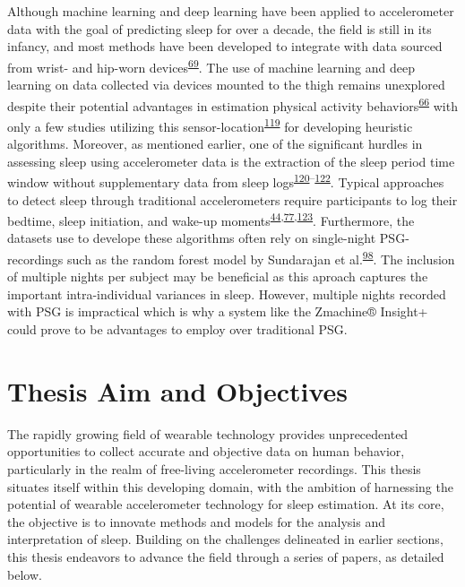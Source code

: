 \documentclass[
  10pt,
]{scrbook}
\begin{document}
Although machine learning and deep learning have been applied to
accelerometer data with the goal of predicting sleep for over a decade,
the field is still in its infancy, and most methods have been developed
to integrate with data sourced from wrist- and hip-worn
devices\textsuperscript{\protect\hyperlink{ref-conley_agreement_2019}{69}}.
The use of machine learning and deep learning on data collected via
devices mounted to the thigh remains unexplored despite their potential
advantages in estimation physical activity
behaviors\textsuperscript{\protect\hyperlink{ref-bruxf8nd_2020}{66}}
with only a few studies utilizing this
sensor-location\textsuperscript{\protect\hyperlink{ref-winkler_identifying_2016}{119}}
for developing heuristic algorithms. Moreover, as mentioned earlier, one
of the significant hurdles in assessing sleep using accelerometer data
is the extraction of the sleep period time window without supplementary
data from sleep
logs\textsuperscript{\protect\hyperlink{ref-doherty_large_2017}{120}--\protect\hyperlink{ref-anderson_assessment_2014}{122}}.
Typical approaches to detect sleep through traditional accelerometers
require participants to log their bedtime, sleep initiation, and wake-up
moments\textsuperscript{\protect\hyperlink{ref-girschik_validation_2012}{44},\protect\hyperlink{ref-littner_2003}{77},\protect\hyperlink{ref-lockley_1999}{123}}.
Furthermore, the datasets use to develope these algorithms often rely on
single-night PSG-recordings such as the random forest model by
Sundarajan et
al.\textsuperscript{\protect\hyperlink{ref-sundararajan_sleep_2021}{98}}.
The inclusion of multiple nights per subject may be beneficial as this
aproach captures the important intra-individual variances in sleep.
However, multiple nights recorded with PSG is impractical which is why a
system like the Zmachine® Insight+ could prove to be advantages to
employ over traditional PSG.

\hypertarget{thesis-aim-and-objectives}{%
\section{Thesis Aim and Objectives}\label{thesis-aim-and-objectives}}

The rapidly growing field of wearable technology provides unprecedented
opportunities to collect accurate and objective data on human behavior,
particularly in the realm of free-living accelerometer recordings. This
thesis situates itself within this developing domain, with the ambition
of harnessing the potential of wearable accelerometer technology for
sleep estimation. At its core, the objective is to innovate methods and
models for the analysis and interpretation of sleep. Building on the
challenges delineated in earlier sections, this thesis endeavors to
advance the field through a series of papers, as detailed below.
\end{document}
